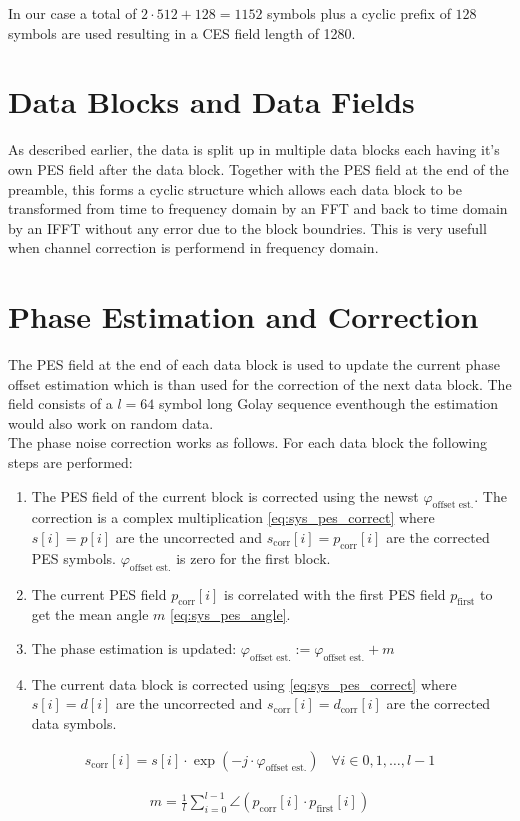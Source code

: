 In our case a total of $2 \cdot 512 + 128 = 1152$ symbols plus
a cyclic prefix of $128$ symbols are used resulting in a \gls{CES} field
length of 1280.

\section{Data Blocks and Data Fields}
As described earlier, the data is split up in multiple data blocks
each having it's own \gls{PES} field after the data block.
Together with the \gls{PES} field at the end of the preamble, this forms
a cyclic structure which allows each data block to be transformed
from time to frequency domain by an \gls{FFT} and back to time domain
by an \gls{IFFT} without any error due to the block boundries.
This is very usefull when channel correction is performend in frequency domain.

\section{Phase Estimation and Correction}
The \gls{PES} field at the end of each data block is used to update
the current phase offset estimation which is than used for the correction
of the next data block. The field consists of a $l=64$ symbol long Golay
sequence eventhough the estimation would also work on random data. \\

The phase noise correction works as follows. For each data block
the following steps are performed:

\begin{enumerate}
\item The \gls{PES} field of the current block is corrected
  using the newst $\varphi_{\text{offset est.}}$.
  The correction is a complex multiplication \eqref{eq:sys_pes_correct}
  where $s[i] = p[i]$ are the uncorrected and
  $s_{\text{corr}}[i] = p_{\text{corr}}[i]$ are the corrected \gls{PES} symbols.
  $\varphi_{\text{offset est.}}$ is zero for the first block.
\item The current \gls{PES} field $p_{\text{corr}}[i]$
  is correlated with the first \gls{PES} field $p_{\text{first}}$
  to get the mean angle $m$ \eqref{eq:sys_pes_angle}.
\item The phase estimation is updated:
  $\varphi_{\text{offset est.}} := \varphi_{\text{offset est.}} + m$
\item The current data block is corrected using \eqref{eq:sys_pes_correct}
  where $s[i] = d[i]$ are the uncorrected and
  $s_{\text{corr}}[i] = d_{\text{corr}}[i]$ are the corrected data symbols.
\end{enumerate}

\begin{align}
  \label{eq:sys_pes_correct}
  s_{\text{corr}}[i] = s[i] \cdot \exp(-j \cdot \varphi_{\text{offset est.}})
  \;\;\; \forall i \in {0, 1, \dots, l-1}
\end{align}

\begin{align}
  \label{eq:sys_pes_angle}
  m = \frac{1}{l}
  \sum_{i=0}^{l-1} \angle(p_{\text{corr}}[i] \cdot p_{\text{first}}[i])
\end{align}
